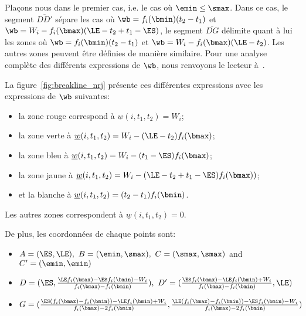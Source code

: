 Plaçons nous dans le premier cas, i.e. le cas où $\emin \le
\smax$. Dans ce cas, le segment $\overline{DD'}$ sépare les cas où
$\wb= f_i(\bmin)(t_2-t_1)$ et $\wb= W_i -
f_i(\bmax)(\LE-t_2+t_1-\ES)$, le segment $\overline{DG}$ délimite
quant à lui les zones où $\wb=f_i(\bmin)(t_2-t_1)$ et $\wb= W_i -
f_i(\bmax)(\LE-t_2)$. Les autres zones peuvent être définies de
manière similaire. Pour une analyse complète des différents
expressions de $\wb$, nous renvoyons le lecteur
à~\cite{ArtiguesLopez}. 

La figure~\ref{fig:breakline_nrj} présente ces différentes expressions
avec les expressions de $\wb$ suivantes: 
\begin{itemize}
\item la zone rouge correspond à $\underline{w}(i,t_1,t_2)=W_i$;
\item la zone verte à $\underline{w}(i,t_1,t_2)=W_i-(\LE-t_2)f_i(\bmax)$;
\item la zone bleu à $\underline{w}(i,t_1,t_2)=W_i-(t_1-\ES)f_i(\bmax)$;
\item la zone jaune à
  $\underline{w}(i,t_1,t_2)=W_i-(\LE-t_2+t_1-\ES)f_i(\bmax))$;
\item et la blanche à $\underline{w}(i,t_1,t_2)=(t_2-t_1)f_i(\bmin)$.
\end{itemize}
Les autres zones correspondent à $\underline{w}(i,t_1,t_2)=0$.

De plus, les coordonnées de chaque points sont:
\begin{itemize}
\item $A=(\ES,\LE),\ B=(\emin,\smax),\
  C=(\smax,\smax)$ and $C'=(\emin,\emin)$
\item
  $D=(\ES,\frac{\LE f_i(\bmax)-\ES f_i(\bmin)-W_i}{f_i(\bmax)-f_i(\bmin)}),\
  D'=(\frac{\ES f_i(\bmax)-\LE f_i(\bmin)+W_i}{f_i(\bmax)-f_i(\bmin)},\LE)$
\item
  $G=(\frac{\ES(f_i(\bmax)-f_i(\bmin))-\LE f_i(\bmin)+W_i}{f_i(\bmax)-2f_i(\bmin)},
  \frac{\LE(f_i(\bmax)-f_i(\bmin))-\ES f_i(\bmin)-W_i}{f_i(\bmax)-2f_i(\bmin)})$
\end{itemize}



